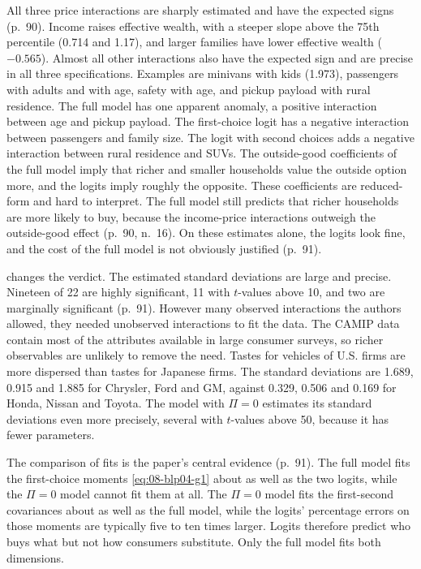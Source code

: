  All three price interactions are sharply estimated and have the expected
signs (p.~90). Income raises effective wealth, with a steeper slope above the 75th percentile (0.714 and 1.17),
and larger families have lower effective wealth ($-0.565$). Almost all other interactions also have the
expected sign and are precise in all three specifications. Examples are minivans with kids (1.973), passengers
with adults and with age, safety with age, and pickup payload with rural residence. The full model has one
apparent anomaly, a positive interaction between age and pickup payload. The first-choice logit has a negative
interaction between passengers and family size. The logit with second choices adds a negative interaction
between rural residence and SUVs. The outside-good coefficients of the full model imply that richer and smaller
households value the outside option more, and the logits imply roughly the opposite. These coefficients are
reduced-form and hard to interpret. The full model still predicts that richer households are more likely to buy,
because the income-price interactions outweigh the outside-good effect (p.~90, n.~16). On these estimates
alone, the logits look fine, and the cost of the full model is not obviously justified (p.~91).

  changes the verdict. The estimated standard
deviations are large and precise. Nineteen of 22 are highly significant, 11 with $t$-values above 10, and two
are marginally significant (p.~91). However many observed interactions the authors allowed, they needed
unobserved interactions to fit the data. The CAMIP data contain most of the attributes available in large
consumer surveys, so richer observables are unlikely to remove the need. Tastes for vehicles of U.S. firms are
more dispersed than tastes for Japanese firms. The standard deviations are 1.689, 0.915 and 1.885 for
Chrysler, Ford and GM, against 0.329, 0.506 and 0.169 for Honda, Nissan and Toyota. The model with $\Pi = 0$ estimates its
standard deviations even more precisely, several with $t$-values above 50, because it has fewer parameters.

 The comparison of fits is the paper's central evidence (p.~91). The full model fits the
first-choice moments \eqref{eq:08-blp04-g1} about as well as the two logits, while the $\Pi = 0$ model cannot
fit them at all. The $\Pi = 0$ model fits the first-second covariances about as well as the full model, while
the logits' percentage errors on those moments are typically five to ten times larger. Logits therefore predict
who buys what but not how consumers substitute. Only the full model fits both dimensions.

